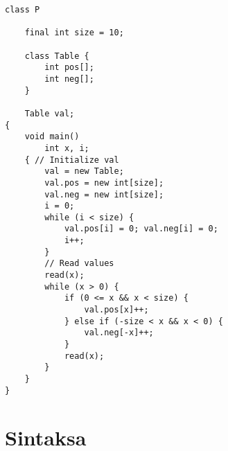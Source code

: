 \begin{lstlisting}
class P

	final int size = 10;

	class Table {
		int pos[];
		int neg[];
	}

	Table val;
{
	void main()
		int x, i;
	{ // Initialize val
		val = new Table;
		val.pos = new int[size];
		val.neg = new int[size];
		i = 0;
		while (i < size) {
			val.pos[i] = 0; val.neg[i] = 0;
			i++;
		}
        // Read values
		read(x);
		while (x > 0) {
			if (0 <= x && x < size) {
				val.pos[x]++;
			} else if (-size < x && x < 0) {
				val.neg[-x]++;
			}
			read(x);
		}
	}
}
\end{lstlisting}

\section{Sintaksa}
